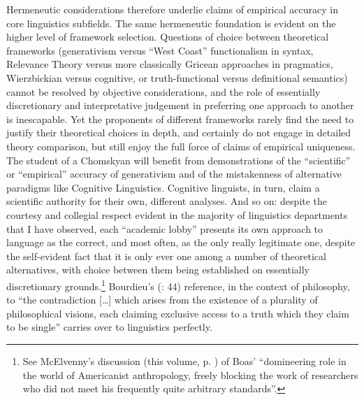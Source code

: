 \documentclass[output=paper]{langscibook}
\begin{document}
Hermeneutic considerations therefore underlie claims of empirical accuracy in core linguistics subfields. The same hermeneutic foundation is evident on the higher level of framework selection. Questions of choice between theoretical frameworks (generativism versus ``West Coast'' functionalism in syntax, Relevance Theory versus more classically Gricean approaches in pragmatics, Wierzbickian versus cognitive, or truth-functional versus definitional semantics) cannot be resolved by objective considerations, and the role of essentially discretionary and interpretative judgement in preferring one approach to another is inescapable. Yet the proponents of different frameworks rarely find the need to justify their theoretical choices in depth, and certainly do not engage in detailed theory comparison, but still enjoy the full force of claims of empirical uniqueness. The student of a Chomskyan will benefit from demonstrations of the ``scientific'' or ``empirical'' accuracy of generativism and of the mistakenness of alternative paradigms like Cognitive Linguistics. Cognitive linguists, in turn, claim a scientific authority for their own, different analyses. And so on: despite the courtesy and collegial respect evident in the majority of linguistics departments that I have observed, each ``academic lobby'' \citep[155]{Rastier1993} presents its own approach to language as the correct, and most often, as the only really legitimate one, despite the self-evident fact that it is only ever one among a number of theoretical alternatives, with choice between them being established on essentially discretionary grounds.\footnote{See McElvenny's discussion (this volume, p. \pageref{q:mcelvenny:domineering}) of Boas' ``domineering role in the world of Americanist anthropology, freely blocking the work of researchers who did not meet his frequently quite arbitrary standards''.} Bourdieu's (\citeyear{Bourdieu20031997}: 44) reference, in the context of philosophy, to ``the contradiction […] which arises from the existence of a plurality of philosophical visions, each claiming exclusive access to a truth which they claim to be single'' carries over to linguistics perfectly.
\end{document}
